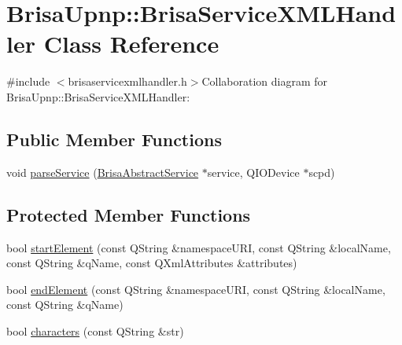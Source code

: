 \hypertarget{classBrisaUpnp_1_1BrisaServiceXMLHandler}{
\section{BrisaUpnp::BrisaServiceXMLHandler Class Reference}
\label{classBrisaUpnp_1_1BrisaServiceXMLHandler}
}


{\ttfamily \#include $<$brisaservicexmlhandler.h$>$}Collaboration diagram for BrisaUpnp::BrisaServiceXMLHandler:\subsection*{Public Member Functions}
\begin{DoxyCompactItemize}
\item 
void \hyperlink{classBrisaUpnp_1_1BrisaServiceXMLHandler_a4805ae2d4d938e9cc47c130e73055c3e}{parseService} (\hyperlink{classBrisaUpnp_1_1BrisaAbstractService}{BrisaAbstractService} $\ast$service, QIODevice $\ast$scpd)
\end{DoxyCompactItemize}
\subsection*{Protected Member Functions}
\begin{DoxyCompactItemize}
\item 
bool \hyperlink{classBrisaUpnp_1_1BrisaServiceXMLHandler_a1bf9047cd3011ff163e654c36ed11966}{startElement} (const QString \&namespaceURI, const QString \&localName, const QString \&qName, const QXmlAttributes \&attributes)
\item 
bool \hyperlink{classBrisaUpnp_1_1BrisaServiceXMLHandler_a9dd0d41c4d373f98ff7526de005f8c39}{endElement} (const QString \&namespaceURI, const QString \&localName, const QString \&qName)
\item 
bool \hyperlink{classBrisaUpnp_1_1BrisaServiceXMLHandler_a146a0f538a0c48f70e211ed3b0a26fc0}{characters} (const QString \&str)
\end{DoxyCompactItemize}


